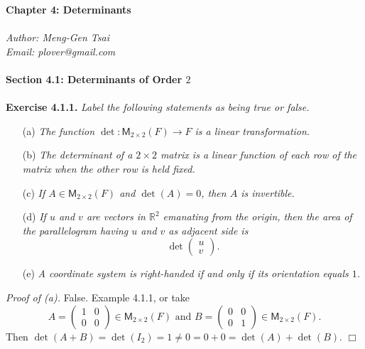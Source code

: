 \documentclass{article}
\begin{document}
\textbf{\Large Chapter 4: Determinants} \\\\



\emph{Author: Meng-Gen Tsai} \\
\emph{Email: plover@gmail.com} \\\\






\textbf{\large Section 4.1: Determinants of Order $2$} \\\\






\textbf{Exercise 4.1.1.}
\emph{Label the following statements as being true or false.}
\begin{enumerate}
\item[(a)]
\emph{The function $\det: \mathsf{M}_{2 \times 2}(F) \to F$
is a linear transformation.}
\item[(b)]
\emph{The determinant of a $2 \times 2$ matrix is a linear function of each row
of the matrix when the other row is held fixed.}
\item[(c)]
\emph{If $A \in \mathsf{M}_{2 \times 2}(F)$ and $\det(A) = 0$, then $A$ is invertible.}
\item[(d)]
\emph{If $u$ and $v$ are vectors in $\mathbb{R}^2$ emanating from the origin,
then the area of the parallelogram having $u$ and $v$ as adjacent side is
$$\det\begin{pmatrix} u \\ v \end{pmatrix}.$$}
\item[(e)]
\emph{A coordinate system is right-handed if and only if its orientation equals $1$.} \\
\end{enumerate}

\emph{Proof of (a).}
False. Example 4.1.1, or
take
$$A =
\begin{pmatrix}
1 & 0 \\
0 & 0
\end{pmatrix} \in \mathsf{M}_{2 \times 2}(F) \text{ and }
B =
\begin{pmatrix}
0 & 0 \\
0 & 1
\end{pmatrix} \in \mathsf{M}_{2 \times 2}(F).
$$
Then $\det(A+B) = \det(I_2) = 1 \neq 0 = 0 + 0 = \det(A) + \det(B)$.
$\Box$ \\
\end{document}
